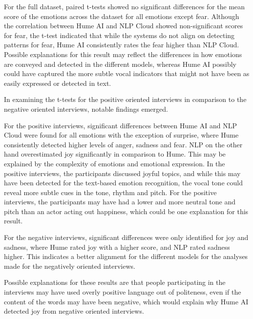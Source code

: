 For the full dataset, paired t-tests showed no significant differences for the mean score of the emotions across the dataset for all emotions except fear. Although the correlation between Hume AI and NLP Cloud showed non-significant scores for fear, the t-test indicated that while the systems do not align on detecting patterns for fear, Hume AI consistently rates the fear higher than NLP Cloud. Possible explanations for this result may reflect the differences in how emotions are conveyed and detected in the different models, whereas Hume AI possibly could have captured the more subtle vocal indicators that might not have been as easily expressed or detected in text.

In examining the t-tests for the positive oriented interviews in comparison to the negative oriented interviews, notable findings emerged.

For the positive interviews, significant differences between Hume AI and NLP Cloud were found for all emotions with the exception of surprise, where Hume consistently detected higher levels of anger, sadness and fear. NLP on the other hand overestimated joy significantly in comparison to Hume. 
This may be explained by the complexity of emotions and emotional expression. In the positive interviews, the participants discussed joyful topics, and while this may have been detected for the text-based emotion recognition, the vocal tone could reveal more subtle cues in the tone, rhythm and pitch. For the positive interviews, the participants may have had a lower and more neutral tone and pitch than an actor acting out happiness, which could be one explanation for this result.

For the negative interviews, significant differences were only identified for joy and sadness, where Hume rated joy with a higher score, and NLP rated sadness higher. This indicates a better alignment for the different models for the analyses made for the negatively oriented interviews.

Possible explanations for these results are that people participating in the interviews may have used overly positive language out of politeness, even if the content of the words may have been negative, which would explain why Hume AI detected joy from negative oriented interviews.
